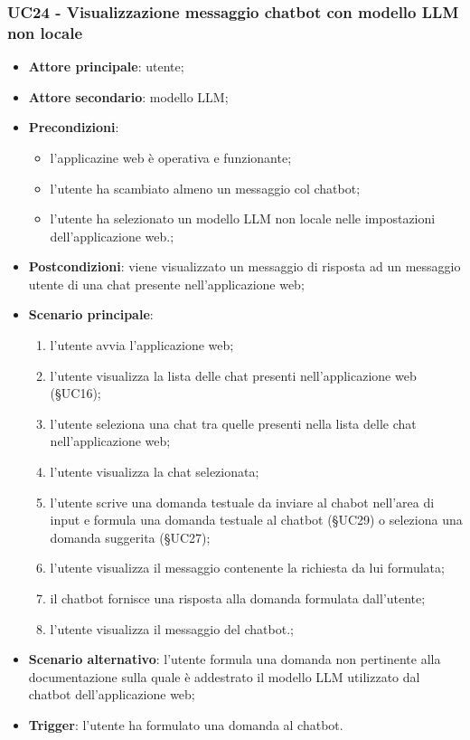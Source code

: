 \documentclass[10pt, a4paper]{article}
\begin{document}
    \subsubsection{UC24 - Visualizzazione messaggio chatbot con modello LLM non locale}
    \begin{itemize}
        \item \textbf{Attore principale}: utente;
        \item \textbf{Attore secondario}: modello LLM;
        \item \textbf{Precondizioni}: 
        \begin{itemize}
            \item l'applicazine web è operativa e funzionante;
            \item l'utente ha scambiato almeno un messaggio col chatbot;
            \item l'utente ha selezionato un modello LLM non locale nelle impostazioni dell'applicazione web.;
        \end{itemize}
        \item \textbf{Postcondizioni}: viene visualizzato un messaggio di risposta ad un messaggio utente di una chat presente nell'applicazione web;
        \item \textbf{Scenario principale}:
            \begin{enumerate}
                \item l'utente avvia l'applicazione web;
                \item l'utente visualizza la lista delle chat presenti nell'applicazione web (\S UC16);
                \item l'utente seleziona una chat tra quelle presenti nella lista delle chat nell'applicazione web;
                \item l'utente visualizza la chat selezionata;
                \item l'utente scrive una domanda testuale da inviare al chabot nell'area di input e formula una domanda testuale al chatbot (\S UC29) o seleziona una domanda suggerita (\S UC27);
                \item l'utente visualizza il messaggio contenente la richiesta da lui formulata;
                \item il chatbot fornisce una risposta alla domanda formulata dall'utente;
                \item l'utente visualizza il messaggio del chatbot.;
            \end{enumerate}
        \item \textbf{Scenario alternativo}: l'utente formula una domanda non pertinente alla documentazione sulla quale è addestrato il modello LLM utilizzato dal chatbot dell'applicazione web; 
        \item \textbf{Trigger}: l'utente ha formulato una domanda al chatbot.
        \end{itemize}
\end{document}
